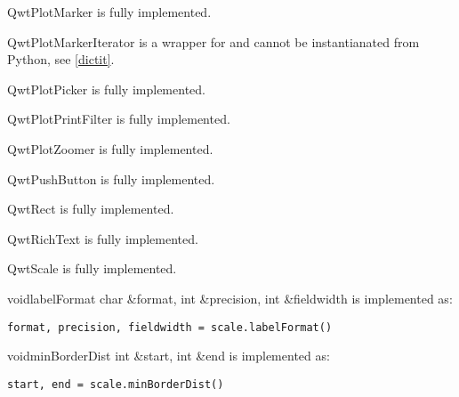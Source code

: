 \documentclass{manual}
\begin{document}
\begin{classdesc*}{QwtPlotMarker}
  is fully implemented.
\end{classdesc*}

\begin{classdesc*}{QwtPlotMarkerIterator}
  is a wrapper for  and cannot be instantianated
  from Python, see \ref{dictit}.
\end{classdesc*}

\begin{classdesc*}{QwtPlotPicker}
  is fully implemented.
\end{classdesc*}

\begin{classdesc*}{QwtPlotPrintFilter}
  is fully implemented.
\end{classdesc*}

\begin{classdesc*}{QwtPlotZoomer}
  is fully implemented.
\end{classdesc*}

\begin{classdesc*}{QwtPushButton}
  is fully implemented.
\end{classdesc*}

\begin{classdesc*}{QwtRect}
  is fully implemented.
\end{classdesc*}

\begin{classdesc*}{QwtRichText}
  is fully implemented.
\end{classdesc*}

\begin{classdesc*}{QwtScale}
  is fully implemented.

  \begin{cfuncdesc}{void}{labelFormat}{
      char \&format, int \&precision, int \&fieldwidth}
    is implemented as:
    \begin{verbatim}
format, precision, fieldwidth = scale.labelFormat()
    \end{verbatim}    
  \end{cfuncdesc}

  \begin{cfuncdesc}{void}{minBorderDist}{
      int \&start, int \&end}
    is implemented as:
    \begin{verbatim}
start, end = scale.minBorderDist()
    \end{verbatim}    
  \end{cfuncdesc}

\end{classdesc*}
\end{document}
